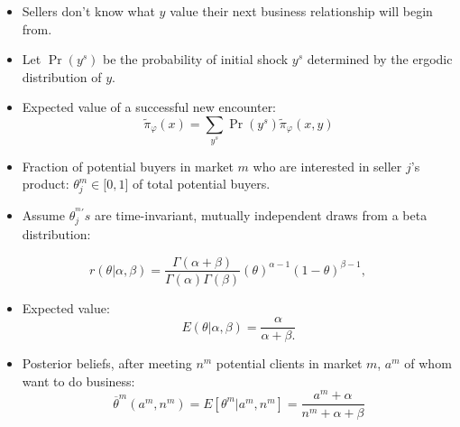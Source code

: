 \documentclass[notes=show]{beamer}
\begin{document}
\begin{frame}%



\begin{itemize}
\item Sellers don't know what $y$ value their next business relationship
will begin from.

\item Let $\Pr (y^{s})$ be the probability of initial shock $y^{s}$
determined by the ergodic distribution of $y$.

\item Expected value of a successful new encounter:%
\[
\widetilde{\pi }_{\varphi }(x)=\sum_{y^{s}}\Pr (y^{s})\widetilde{\pi }%
_{\varphi }(x,y) 
\]
\end{itemize}

\end{frame}%
\begin{frame}%



\begin{itemize}
\item Fraction of potential buyers in market $m$ who are interested in
seller $j$'s product: $\theta _{j}^{m}\in \lbrack 0,1]$ of total potential
buyers.

\item Assume $\theta _{j}^{^{m}\prime }s$ are time-invariant, mutually
independent draws from a beta distribution:
\end{itemize}

\[
r(\theta |\alpha ,\beta )=\frac{\Gamma (\alpha +\beta )}{\Gamma (\alpha
)\Gamma (\beta )}\left( \theta \right) ^{\alpha -1}(1-\theta )^{\beta -1}, 
\]

\begin{itemize}
\item Expected value:%
\[
E(\theta |\alpha ,\beta )=\frac{\alpha }{\alpha +\beta .} 
\]

\item Posterior beliefs, after meeting $n^{m}$ potential clients in market $%
m $, $a^{m}$ of whom want to do business:%
\hyperref{}{}{Bayesian_details}{}%
\[
\overline{\theta }^{m}(a^{m},n^{m})=E\left[ \theta ^{m}|a^{m},n^{m}\right] =%
\frac{a^{m}+\alpha }{n^{m}+\alpha +\beta } 
\]
\end{itemize}

\end{frame}%
\end{document}
